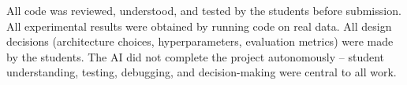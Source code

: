 \documentclass[letterpaper]{article} %
\begin{document}
All code was reviewed, understood, and tested by the students before submission. All experimental results were obtained by running code on real data. All design decisions (architecture choices, hyperparameters, evaluation metrics) were made by the students. The AI did not complete the project autonomously -- student understanding, testing, debugging, and decision-making were central to all work.



\end{document}
